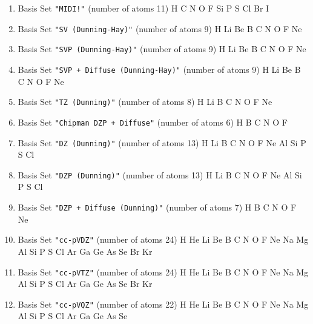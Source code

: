 \begin{enumerate}
\item Basis Set \verb#"MIDI!"# (number of atoms 11)  \newline
  H C N O F Si P S Cl Br I


\item Basis Set \verb#"SV (Dunning-Hay)"# (number of atoms 9)  \newline
  H Li Be B C N O F Ne


\item Basis Set \verb#"SVP (Dunning-Hay)"# (number of atoms 9)  \newline
  H Li Be B C N O F Ne


\item Basis Set \verb#"SVP + Diffuse (Dunning-Hay)"# (number of atoms 9)  \newline
  H Li Be B C N O F Ne


\item Basis Set \verb#"TZ (Dunning)"# (number of atoms 8)  \newline
  H Li B C N O F Ne


\item Basis Set \verb#"Chipman DZP + Diffuse"# (number of atoms 6)  \newline
  H B C N O F


\item Basis Set \verb#"DZ (Dunning)"# (number of atoms 13)  \newline
  H Li B C N O F Ne Al Si P S Cl


\item Basis Set \verb#"DZP (Dunning)"# (number of atoms 13)  \newline
  H Li B C N O F Ne Al Si P S Cl

\item Basis Set \verb#"DZP + Diffuse (Dunning)"# (number of atoms 7)  \newline
  H B C N O F Ne


\item Basis Set \verb#"cc-pVDZ"# (number of atoms 24)  \newline
  H He Li Be B C N O F Ne Na Mg Al Si P S Cl Ar Ga Ge As Se Br Kr


\item Basis Set \verb#"cc-pVTZ"# (number of atoms 24)  \newline
  H He Li Be B C N O F Ne Na Mg Al Si P S Cl Ar Ga Ge As Se Br Kr


\item Basis Set \verb#"cc-pVQZ"# (number of atoms 22)  \newline
  H He Li Be B C N O F Ne Na Mg Al Si P S Cl Ar Ga Ge As Se



\end{enumerate}
